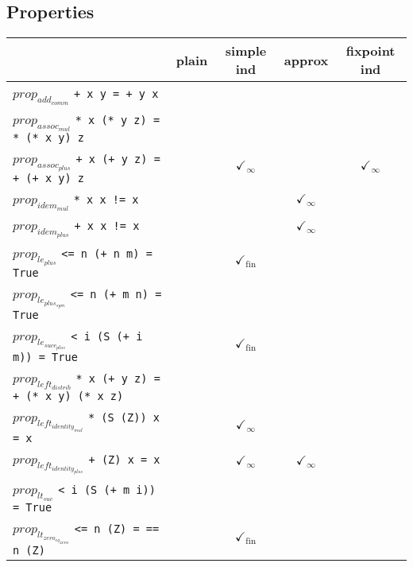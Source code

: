 \documentclass{article}
\begin{document}
\subsection*{Properties}
\begin{longtable}{p{10cm} || c | c | c | c | }
  & plain & simple ind & approx & fixpoint ind \\
\hline
$prop_{add_{comm}}$ \newline \verb`+ x y = + y x` &  &  &  &  \\
\hline
$prop_{assoc_{mul}}$ \newline \verb`* x (* y z) = * (* x y) z` &  &  &  &  \\
\hline
$prop_{assoc_{plus}}$ \newline \verb`+ x (+ y z) = + (+ x y) z` &  & $\checkmark_{\infty}$ &  & $\checkmark_{\infty}$ \\
\hline
$prop_{idem_{mul}}$ \newline \verb`* x x != x` &  &  & $\checkmark_{\infty}$ &  \\
\hline
$prop_{idem_{plus}}$ \newline \verb`+ x x != x` &  &  & $\checkmark_{\infty}$ &  \\
\hline
$prop_{le_{plus}}$ \newline \verb`<= n (+ n m) = True` &  & $\checkmark_{\mathrm{fin}}$ &  &  \\
\hline
$prop_{le_{plus_{sym}}}$ \newline \verb`<= n (+ m n) = True` &  &  &  &  \\
\hline
$prop_{le_{succ_{plus}}}$ \newline \verb`< i (S (+ i m)) = True` &  & $\checkmark_{\mathrm{fin}}$ &  &  \\
\hline
$prop_{left_{distrib}}$ \newline \verb`* x (+ y z) = + (* x y) (* x z)` &  &  &  &  \\
\hline
$prop_{left_{identity_{mul}}}$ \newline \verb`* (S (Z)) x = x` &  & $\checkmark_{\infty}$ &  &  \\
\hline
$prop_{left_{identity_{plus}}}$ \newline \verb`+ (Z) x = x` &  & $\checkmark_{\infty}$ & $\checkmark_{\infty}$ &  \\
\hline
$prop_{lt_{suc}}$ \newline \verb`< i (S (+ m i)) = True` &  &  &  &  \\
\hline
$prop_{lt_{zero_{eq_{zero}}}}$ \newline \verb`<= n (Z) = == n (Z)` &  & $\checkmark_{\mathrm{fin}}$ &  &  \\

\end{longtable}
\end{document}
